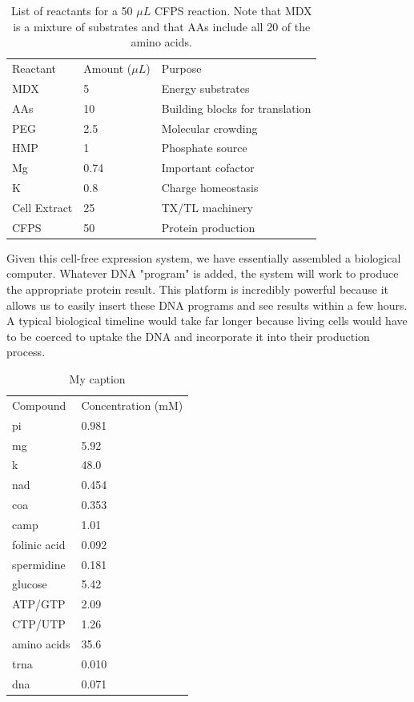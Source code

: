 \begin{table}[]
\centering
\caption{List of reactants for a 50 $\mu L$ CFPS reaction. 
Note that MDX is a mixture of substrates and that AAs include all 20 of the amino acids.}
\label{tab:cf-nrg}
\begin{tabular}{lll}
Reactant     & Amount ($\mu L$) & Purpose                         \\
MDX          & 5               & Energy substrates               \\
AAs          & 10              & Building blocks for translation \\
PEG          & 2.5             & Molecular crowding              \\
HMP          & 1               & Phosphate source                \\
Mg           & 0.74            & Important cofactor              \\
K            & 0.8             & Charge homeostasis              \\
Cell Extract & 25              & TX/TL machinery                 \\ \hline
CFPS         & 50              & Protein production             
\end{tabular}
\end{table}

Given this cell-free expression system, we have essentially assembled a biological computer.
Whatever DNA "program" is added, the system will work to produce the appropriate protein result.
This platform is incredibly powerful because it allows us to easily insert these DNA programs and see results within a few hours.
A typical biological timeline would take far longer because living cells would have to be coerced to uptake the DNA and incorporate it into their production process.

\begin{table}[]
\centering
\caption{My caption}
\label{tab:cf-conc}
\begin{tabular}{ll}
Compound     & Concentration (mM) \\
pi           & 0.981              \\
mg           & 5.92               \\
k            & 48.0               \\
nad          & 0.454              \\
coa          & 0.353              \\
camp         & 1.01               \\
folinic acid & 0.092              \\
spermidine   & 0.181              \\
glucose      & 5.42               \\
ATP/GTP      & 2.09               \\
CTP/UTP      & 1.26               \\
amino acids  & 35.6               \\
trna         & 0.010              \\
dna          & 0.071             
\end{tabular}
\end{table}

